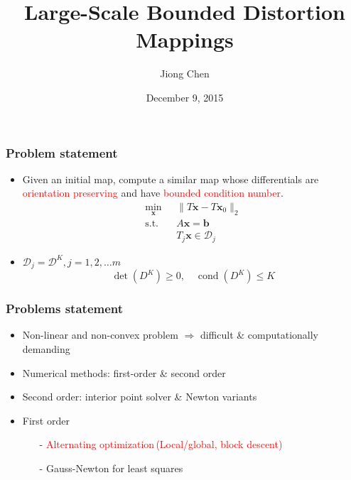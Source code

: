\documentclass[serif,mathserif]{beamer}
\author[Jiong Chen]{Jiong Chen}
\title[\hspace{2em}\insertframenumber/\inserttotalframenumber]{Large-Scale Bounded Distortion Mappings}
\date{December 9, 2015} %
\newcommand{\BOLD}[1]{\mathbf{#1}}
\newcommand{\TODO}[1]{\textcolor{red}{#1}}
\DeclareMathOperator{\cond}{cond}
\DeclareMathOperator{\ST}{s.t.}
\begin{document}
\maketitle

\begin{frame}
 \frametitle{Problem statement}
 \begin{itemize}
  \item Given an initial map, compute a similar map whose differentials are \TODO{orientation preserving}
  and have \TODO{bounded condition number}.
  \Large
 \begin{equation*}
 \boxed{
  \begin{aligned}
    \min_{\BOLD{x}}~~&\|T\BOLD{x}-T\BOLD{x}_0\|_2  \\ 
    \ST \quad &A\BOLD{x} = \BOLD{b}\\
    &T_j\BOLD{x} \in \mathcal{D}_j
  \end{aligned}
 }
 \end{equation*}
 \large
 \item $\mathcal{D}_j=\mathcal{D}^K, j=1,2,\dots m$
 \begin{equation*}
  \det(D^K) \ge  0, \quad \cond(D^K) \le K
 \end{equation*}
 \end{itemize}
\end{frame}

\begin{frame}
 \frametitle{Problems statement}
 \begin{itemize}
  \item Non-linear and non-convex problem $\Rightarrow$ difficult \& computationally demanding
  \item Numerical methods: first-order \& second order
  \item Second order: interior point solver \& Newton variants
  \item First order 
    \begin{itemize}
     \item[-] \textcolor{red}{Alternating optimization\,(Local/global, block descent)}
     \item[-] \textcolor{green!50!black}{Gauss-Newton for least squares}
    \end{itemize}
 \end{itemize}
  {
 }
\end{frame}
\end{document}
